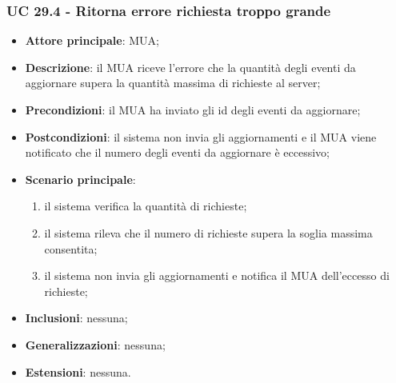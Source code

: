     \subsubsection{UC 29.4 - Ritorna errore richiesta troppo grande} \label{sec:UC29.4}
    \begin{itemize}
        \item \textbf{Attore principale}: MUA;
        \item \textbf{Descrizione}: il MUA riceve l'errore che la quantità degli eventi da aggiornare supera la quantità massima di richieste al server;
        \item \textbf{Precondizioni}: il MUA ha inviato gli id degli eventi da aggiornare;
        \item \textbf{Postcondizioni}: il sistema non invia gli aggiornamenti e il MUA viene notificato che il numero degli eventi da aggiornare è eccessivo;
        \item \textbf{Scenario principale}:
            \begin{enumerate}
                \item il sistema verifica la quantità di richieste;
                \item il sistema rileva che il numero di richieste supera la soglia massima consentita;
                \item il sistema non invia gli aggiornamenti e notifica il MUA dell'eccesso di richieste;
            \end{enumerate}
        \item \textbf{Inclusioni}: nessuna;
        \item \textbf{Generalizzazioni}: nessuna;
        \item \textbf{Estensioni}: nessuna.
    \end{itemize}

